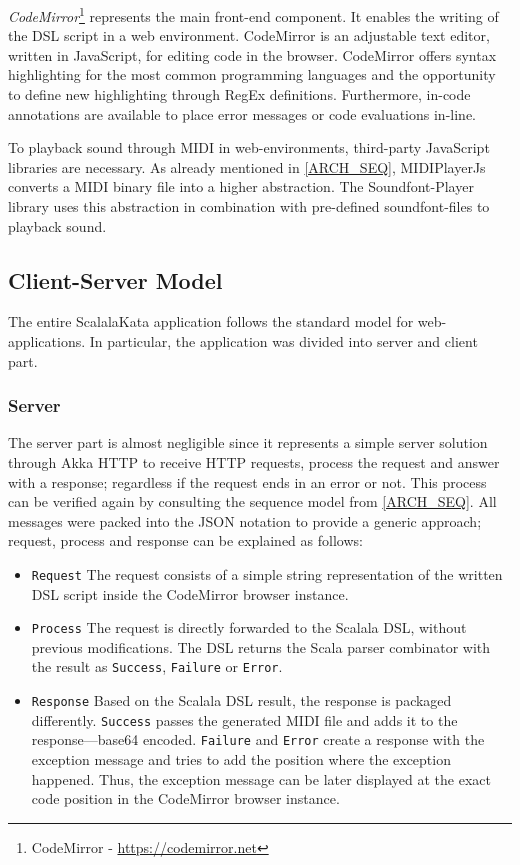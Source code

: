 \textit{CodeMirror}\footnote{CodeMirror - \url{https://codemirror.net}} represents the main front-end component. It enables the writing of the DSL script in a web environment. CodeMirror is an adjustable text editor, written in JavaScript, for editing code in the browser.\cite{Codemirror} CodeMirror offers syntax highlighting for the most common programming languages and the opportunity to define new highlighting through RegEx definitions. Furthermore, in-code annotations are available to place error messages or code evaluations in-line.

To playback sound through MIDI in web-environments, third-party JavaScript libraries are necessary. As already mentioned in \ref{ARCH_SEQ}, MIDIPlayerJs converts a MIDI binary file into a higher abstraction. The Soundfont-Player library uses this abstraction in combination with pre-defined soundfont-files to playback sound.

\subsection{Client-Server Model}
\label{IMPL_SCALALAKATA_CSMODEL}
The entire ScalalaKata application follows the standard model for web-applications. In particular, the application was divided into server and client part.

\subsubsection{Server}
\label{IMPL_SCALALAKATA_CSMODEL_SERVER}
The server part is almost negligible since it represents a simple server solution through Akka HTTP to receive HTTP requests, process the request and answer with a response; regardless if the request ends in an error or not. This process can be verified again by consulting the sequence model from \ref{ARCH_SEQ}. All messages were packed into the JSON notation to provide a generic approach; request, process and response can be explained as follows:

\begin{itemize}
\item\texttt{Request}\newline
The request consists of a simple string representation of the written DSL script inside the CodeMirror browser instance.

\item\texttt{Process}\newline
The request is directly forwarded to the Scalala DSL, without previous modifications. The DSL returns the Scala parser combinator with the result as \texttt{Success}, \texttt{Failure} or \texttt{Error}.

\item\texttt{Response}\newline
Based on the Scalala DSL result, the response is packaged differently. \texttt{Success} passes the generated MIDI file and adds it to the response—base64 encoded. \texttt{Failure} and \texttt{Error} create a response with the exception message and tries to add the position where the exception happened. Thus, the exception message can be later displayed at the exact code position in the CodeMirror browser instance.
\end{itemize}

